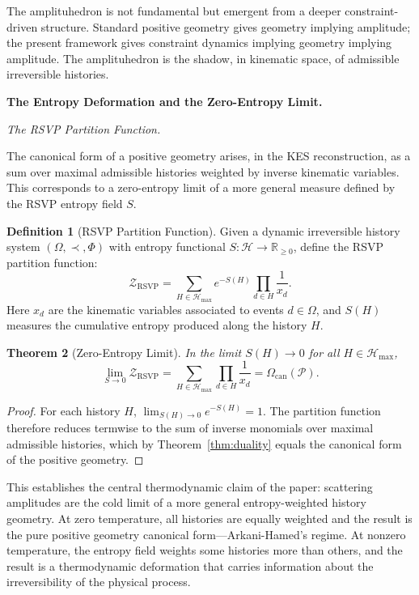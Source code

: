 \documentclass[12pt, oneside]{amsart}
\theoremstyle{plain}
\newtheorem{theorem}{Theorem}[section]
\theoremstyle{definition}
\newtheorem{definition}[theorem]{Definition}
\theoremstyle{remark}
\newcommand{\R}{\mathbb{R}}
\newcommand{\Phif}{\Phi}
\newcommand{\Sf}{S}
\newcommand{\OmKS}{\Omega}
\newcommand{\CF}{\Omega_{\mathrm{can}}}
\newcommand{\ZRSVP}{\mathcal{Z}_{\mathrm{RSVP}}}
\newcommand{\Hmax}{\mathcal{H}_{\max}}
\begin{document}
The amplituhedron is not fundamental but emergent from a deeper constraint-driven structure. Standard positive geometry gives geometry implying amplitude; the present framework gives constraint dynamics implying geometry implying amplitude. The amplituhedron is the shadow, in kinematic space, of admissible irreversible histories.

\bigskip\noindent\textbf{The Entropy Deformation and the Zero-Entropy Limit.}
\label{sec:entropy}

\medskip\noindent\textit{The RSVP Partition Function.}

The canonical form of a positive geometry arises, in the KES reconstruction, as a sum over maximal admissible histories weighted by inverse kinematic variables. This corresponds to a zero-entropy limit of a more general measure defined by the RSVP entropy field $\Sf$.

\begin{definition}[RSVP Partition Function]
Given a dynamic irreversible history system $(\OmKS, \prec, \Phif)$ with entropy functional $\Sf: \mathcal{H} \to \R_{\geq 0}$, define the RSVP partition function:
\begin{equation}
\label{eq:rsvp-partition}
  \ZRSVP = \sum_{H \in \Hmax} e^{-\Sf(H)} \prod_{d \in H} \frac{1}{x_d}.
\end{equation}
Here $x_d$ are the kinematic variables associated to events $d \in \OmKS$, and $\Sf(H)$ measures the cumulative entropy produced along the history $H$.
\end{definition}

\begin{theorem}[Zero-Entropy Limit]
\label{thm:zero-entropy}
In the limit $\Sf(H) \to 0$ for all $H \in \Hmax$,
\[
  \lim_{\Sf \to 0} \ZRSVP = \sum_{H \in \Hmax} \prod_{d \in H} \frac{1}{x_d} = \CF(\mathcal{P}).
\]
\end{theorem}

\begin{proof}
For each history $H$, $\lim_{\Sf(H) \to 0} e^{-\Sf(H)} = 1$. The partition function therefore reduces termwise to the sum of inverse monomials over maximal admissible histories, which by Theorem~\ref{thm:duality} equals the canonical form of the positive geometry.
\end{proof}

This establishes the central thermodynamic claim of the paper: scattering amplitudes are the cold limit of a more general entropy-weighted history geometry. At zero temperature, all histories are equally weighted and the result is the pure positive geometry canonical form---Arkani-Hamed's regime. At nonzero temperature, the entropy field weights some histories more than others, and the result is a thermodynamic deformation that carries information about the irreversibility of the physical process.
\end{document}
